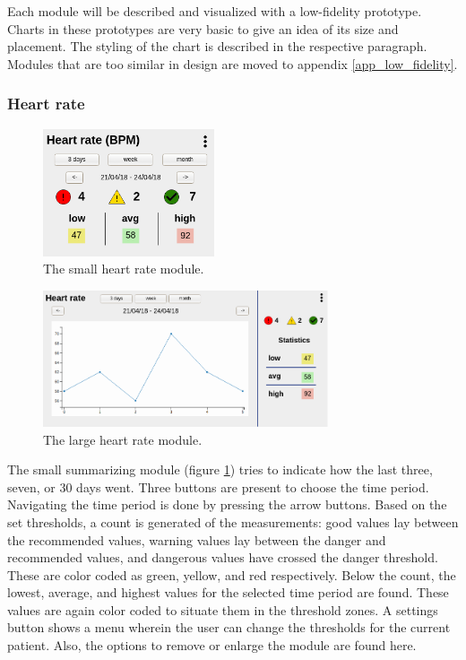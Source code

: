    Each module will be described and visualized with a low-fidelity prototype. Charts in these prototypes are very basic to give an idea of its size and placement. The styling of the chart is described in the respective paragraph. Modules that are too similar in design are moved to appendix \ref{app_low_fidelity}.

        \subsubsection{Heart rate}

        \begin{figure}[!htb]
            \centering
            \includegraphics[width=0.45\textwidth]{chapters/3_design/mockups/heart_small}
            \caption{The small heart rate module.}\label{fig:hr_small}
        \end{figure}
        \begin{figure}[!htb]
            \centering
            \includegraphics[width=0.75\textwidth]{chapters/3_design/mockups/heart_large}
            \caption{The large heart rate module.}\label{fig:hr_large}
        \end{figure}

        The small summarizing module (figure \ref{fig:hr_small}) tries to indicate how the last three, seven, or 30 days went. Three buttons are present to choose the time period. Navigating the time period is done by pressing the arrow buttons. Based on the set thresholds, a count is generated of the measurements: good values lay between the recommended values, warning values lay between the danger and recommended values, and dangerous values have crossed the danger threshold. These are color coded as green, yellow, and red respectively. Below the count, the lowest, average, and highest values for the selected time period are found. These values are again color coded to situate them in the threshold zones. A settings button shows a menu wherein the user can change the thresholds for the current patient. Also, the options to remove or enlarge the module are found here.

